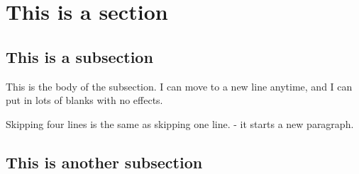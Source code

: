 \documentclass[12pt, a4paper]{article}
\begin{document}
\section{This is a section}
\subsection{This is a subsection}
This is the body of the subsection.
I can move to a new line anytime, and I can put in     lots     of     blanks     with     no     effects.




Skipping four lines is the same as skipping one line.
- it starts a new paragraph.
	
\subsection{This is another subsection}
\end{document}
